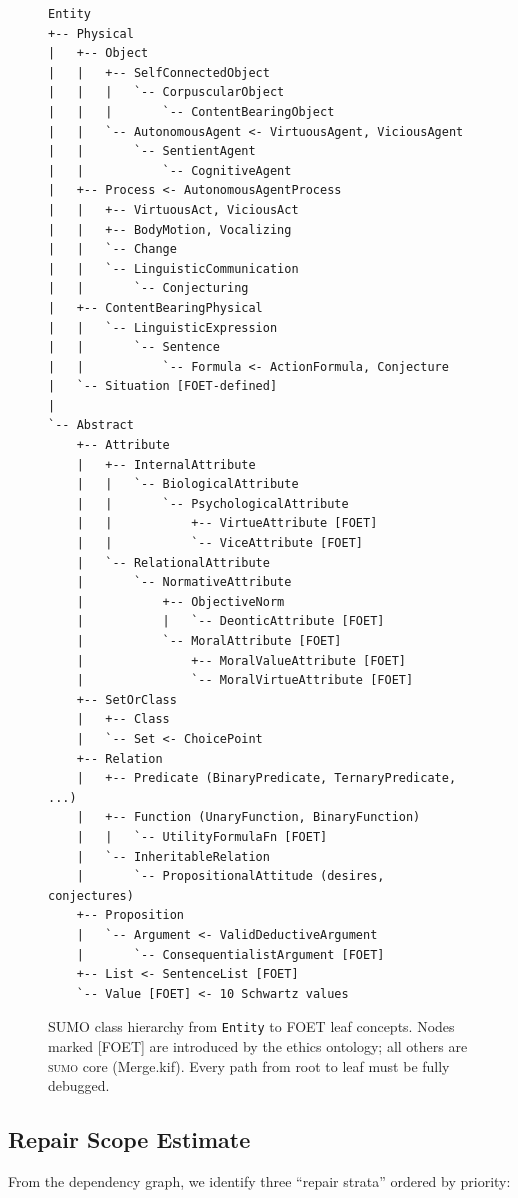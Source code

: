\documentclass[11pt]{article}
\newcommand{\SUMO}{\textsc{sumo}}
\theoremstyle{definition}
\theoremstyle{plain}
\begin{document}
\begin{figure}[ht]
\centering
\small
\begin{verbatim}
Entity
+-- Physical
|   +-- Object
|   |   +-- SelfConnectedObject
|   |   |   `-- CorpuscularObject
|   |   |       `-- ContentBearingObject
|   |   `-- AutonomousAgent <- VirtuousAgent, ViciousAgent
|   |       `-- SentientAgent
|   |           `-- CognitiveAgent
|   +-- Process <- AutonomousAgentProcess
|   |   +-- VirtuousAct, ViciousAct
|   |   +-- BodyMotion, Vocalizing
|   |   `-- Change
|   |   `-- LinguisticCommunication
|   |       `-- Conjecturing
|   +-- ContentBearingPhysical
|   |   `-- LinguisticExpression
|   |       `-- Sentence
|   |           `-- Formula <- ActionFormula, Conjecture
|   `-- Situation [FOET-defined]
|
`-- Abstract
    +-- Attribute
    |   +-- InternalAttribute
    |   |   `-- BiologicalAttribute
    |   |       `-- PsychologicalAttribute
    |   |           +-- VirtueAttribute [FOET]
    |   |           `-- ViceAttribute [FOET]
    |   `-- RelationalAttribute
    |       `-- NormativeAttribute
    |           +-- ObjectiveNorm
    |           |   `-- DeonticAttribute [FOET]
    |           `-- MoralAttribute [FOET]
    |               +-- MoralValueAttribute [FOET]
    |               `-- MoralVirtueAttribute [FOET]
    +-- SetOrClass
    |   +-- Class
    |   `-- Set <- ChoicePoint
    +-- Relation
    |   +-- Predicate (BinaryPredicate, TernaryPredicate, ...)
    |   +-- Function (UnaryFunction, BinaryFunction)
    |   |   `-- UtilityFormulaFn [FOET]
    |   `-- InheritableRelation
    |       `-- PropositionalAttitude (desires, conjectures)
    +-- Proposition
    |   `-- Argument <- ValidDeductiveArgument
    |       `-- ConsequentialistArgument [FOET]
    +-- List <- SentenceList [FOET]
    `-- Value [FOET] <- 10 Schwartz values
\end{verbatim}
\caption{SUMO class hierarchy from \texttt{Entity} to FOET leaf
  concepts.  Nodes marked [FOET] are introduced by the ethics ontology;
  all others are \SUMO{} core (Merge.kif).  Every path from root to
  leaf must be fully debugged.}
\label{fig:foet-deps}
\end{figure}

\subsection{Repair Scope Estimate}

From the dependency graph, we identify three ``repair strata'' ordered
by priority:
\end{document}
